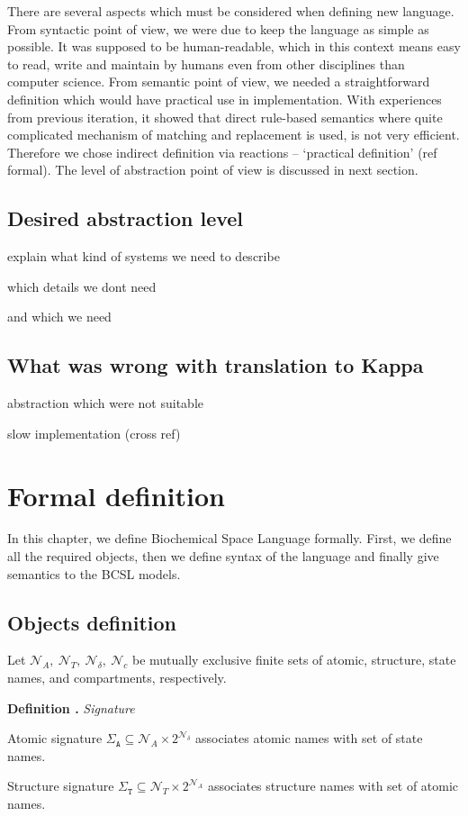 \documentclass[12pt]{fithesis2}
\newcounter{counter}[section]
\renewcommand{\thecounter}{\thesection.\arabic{counter}}
\newenvironment{definition}[1]{\bigskip\refstepcounter{counter}\noindent\textbf{Definition \thecounter } \textit{#1} \par\nopagebreak}{\bigskip}
\begin{document}
There are several aspects which must be considered when defining new language. From syntactic point of view, we were due to keep the language as simple as possible. It was supposed to be human-readable, which in this context means easy to read, write and maintain by humans even from other disciplines than computer science. From semantic point of view, we needed a straightforward definition which would have practical use in implementation. With experiences from previous iteration, it showed that direct rule-based semantics where quite complicated mechanism of matching and replacement is used, is not very efficient. Therefore we chose indirect definition via reactions -- `practical definition' (ref formal). The level of abstraction point of view is discussed in next section.

\section{Desired abstraction level}

explain what kind of systems we need to describe

which details we dont need

and which we need

\section{What was wrong with translation to Kappa}

abstraction which were not suitable

slow implementation (cross ref)

\chapter{Formal definition}

In this chapter, we define Biochemical Space Language formally. First, we define all the required objects, then we define syntax of the language and finally give semantics to the BCSL models.

\section{Objects definition}

Let $\mathcal{N}_{A},~\mathcal{N}_{T},~\mathcal{N}_{\delta},~\mathcal{N}_{c}$ be mutually exclusive finite sets of atomic, structure, state names, and compartments, respectively.

\begin{definition}{Signature}
Atomic signature $\Sigma_{\mathtt{A}} \subseteq \mathcal{N}_{A} \times 2^{\mathcal{N}_{\delta}}$ associates atomic names with set of state names. 

Structure signature $\Sigma_{\mathtt{T}} \subseteq \mathcal{N}_{T} \times 2^{\mathcal{N}_{A}}$ associates structure names with set of atomic names. 
\end{definition}
\end{document}
